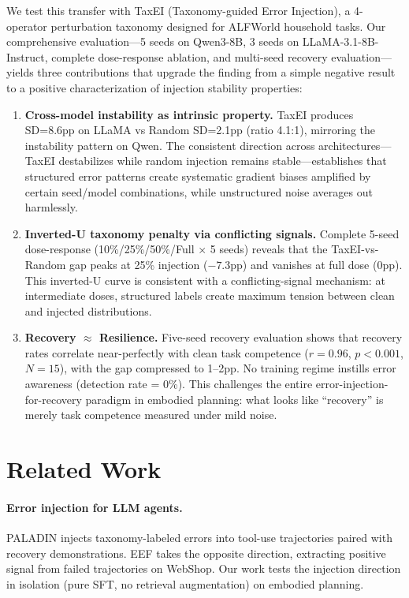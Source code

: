 \documentclass[11pt,a4paper]{article}
\begin{document}
We test this transfer with TaxEI (Taxonomy-guided Error Injection), a 4-operator perturbation taxonomy designed for ALFWorld household tasks. Our comprehensive evaluation---5 seeds on Qwen3-8B, 3 seeds on LLaMA-3.1-8B-Instruct, complete dose-response ablation, and multi-seed recovery evaluation---yields three contributions that upgrade the finding from a simple negative result to a positive characterization of injection stability properties:

\begin{enumerate}
    \item \textbf{Cross-model instability as intrinsic property.} TaxEI produces SD=8.6pp on LLaMA vs Random SD=2.1pp (ratio 4.1:1), mirroring the instability pattern on Qwen. The consistent direction across architectures---TaxEI destabilizes while random injection remains stable---establishes that structured error patterns create systematic gradient biases amplified by certain seed/model combinations, while unstructured noise averages out harmlessly.

    \item \textbf{Inverted-U taxonomy penalty via conflicting signals.} Complete 5-seed dose-response (10\%/25\%/50\%/Full $\times$ 5 seeds) reveals that the TaxEI-vs-Random gap peaks at 25\% injection ($-7.3$pp) and vanishes at full dose (0pp). This inverted-U curve is consistent with a conflicting-signal mechanism: at intermediate doses, structured labels create maximum tension between clean and injected distributions.

    \item \textbf{Recovery $\approx$ Resilience.} Five-seed recovery evaluation shows that recovery rates correlate near-perfectly with clean task competence ($r=0.96$, $p<0.001$, $N=15$), with the gap compressed to 1--2pp. No training regime instills error awareness (detection rate = 0\%). This challenges the entire error-injection-for-recovery paradigm in embodied planning: what looks like ``recovery'' is merely task competence measured under mild noise.
\end{enumerate}

\section{Related Work}

\paragraph{Error injection for LLM agents.} PALADIN \citep{paladin2025} injects taxonomy-labeled errors into tool-use trajectories paired with recovery demonstrations. EEF \citep{eef2025} takes the opposite direction, extracting positive signal from failed trajectories on WebShop. Our work tests the injection direction in isolation (pure SFT, no retrieval augmentation) on embodied planning.
\end{document}
